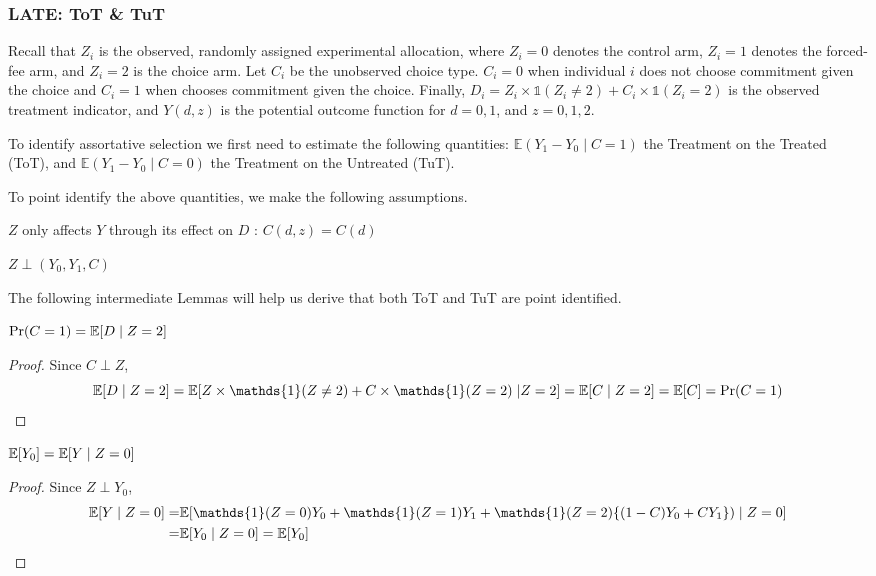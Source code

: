\subsubsection{LATE: ToT \& TuT}
\vspace{.2in}
\normalsize
\linespread{1.25}


 Recall that $Z_i$ is the observed, randomly assigned experimental allocation, where $Z_i=0$ denotes the control arm, $Z_i=1$ denotes the forced-fee arm, and $Z_i=2$ is the choice arm.  Let $C_i$ be the unobserved choice type. $C_i=0$ when individual $i$ does not choose commitment  given the choice and $C_i=1$ when chooses commitment given the choice. Finally, $D_i = Z_i\times \mathds{1}(Z_i\neq 2) + C_i\times \mathds{1}(Z_i=2)$ is the observed treatment indicator, and $Y(d,z)$ is the potential outcome function for $d=0,1$, and $z=0,1,2$. 

 To identify assortative selection we first need to estimate the following quantities: $\mathbb{E}(Y_1-Y_0\;|\;C=1)$ the Treatment on the Treated (ToT), and $\mathbb{E}(Y_1-Y_0\;|\;C=0)$ the Treatment on the Untreated (TuT). 

 To point identify the above quantities, we make the following assumptions.

 \begin{assumption}
$Z$ only affects $Y$ through its effect on $D$ : $C(d,z) = C(d)$
 \end{assumption}

  \begin{assumption}
$Z \perp (Y_0, Y_1, C)$
 \end{assumption}

The following intermediate Lemmas will help us derive that both ToT and TuT are point identified.

\begin{lem}
$\Pr(C=1) = \mathbb{E}[D\;|\;Z=2]$
\end{lem}
\begin{proof}
Since $C\perp Z$, 
$$\E[D\;|\;Z=2] = \E[Z\times \mathds{1}(Z\neq 2)+ C\times\mathds{1}(Z=2)\;|Z=2] = \E[C\;|\;Z=2] = \E[C] = \Pr(C=1)$$
\end{proof}


\begin{lem}
$\mathbb{E}[Y_0] = \mathbb{E}[Y\;|\;Z=0]$
\end{lem}
\begin{proof}
Since $Z\perp Y_0$, 
\begin{align*}
\E[Y\;|\;Z=0] =& \E[\mathds{1}(Z=0)Y_0+\mathds{1}(Z=1)Y_1+\mathds{1}(Z=2)\{(1-C)Y_0+CY_1\})\;|\;Z=0]\\   
=&\E[Y_0\;|\;Z=0] = \E[Y_0]
\end{align*}
\end{proof}


